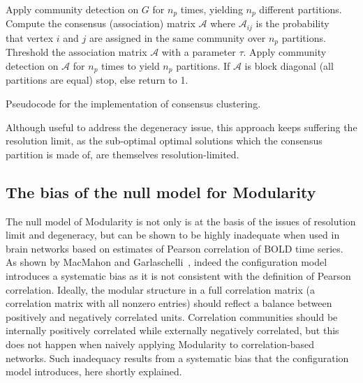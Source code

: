 \begin{Algorithm}[htb!]
\begin{codebox}
\li Apply community detection on $G$ for $n_p$ times, yielding $n_p$ different partitions.
\li Compute the consensus (association) matrix $\mathcal{A}$ where $\mathcal{A}_{ij}$ is the probability \\that vertex $i$ and $j$ are assigned in the same community over $n_p$ partitions.
\li Threshold the association matrix $\mathcal{A}$ with a parameter $\tau$.
\li Apply community detection on $\mathcal{A}$ for $n_p$ times to yield $n_p$ partitions.
\li If $\mathcal{A}$ is block diagonal (all partitions are equal) stop, else return to 1.
\end{codebox}
\caption{Pseudocode for the implementation of consensus clustering.}
\label{alg:consensus_clustering}
\end{Algorithm}

Although useful to address the degeneracy issue, this approach keeps suffering the resolution limit, as the sub-optimal optimal solutions which the consensus partition is made of, are themselves resolution-limited.

\subsection{The bias of the null model for Modularity}
The null model of Modularity is not only is at the basis of the issues of resolution limit and degeneracy, but can be shown to be highly inadequate when used in brain networks based on estimates of Pearson correlation of BOLD time series.
As shown by MacMahon and Garlaschelli~\cite{macmahon2015}, indeed the configuration model introduces a systematic bias as it is not consistent with the definition of Pearson correlation.
Ideally, the modular structure in a full correlation matrix (a correlation matrix with all nonzero entries) should reflect a balance between positively and negatively correlated units. Correlation communities should be internally positively correlated while externally negatively correlated, but this does not happen when naively applying Modularity to correlation-based networks.
Such inadequacy results from a systematic bias that the configuration model introduces, here shortly explained.

